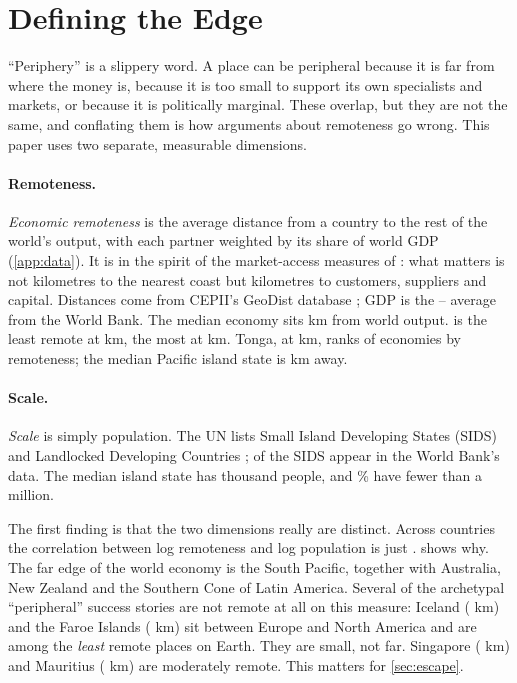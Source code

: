 \section{Defining the Edge}
\label{sec:edge}

\enquote{Periphery} is a slippery word. A place can be peripheral because it
is far from where the money is, because it is too small to support its own
specialists and markets, or because it is politically marginal. These
overlap, but they are not the same, and conflating them is how arguments
about remoteness go wrong. This paper uses two separate, measurable
dimensions.

\paragraph{Remoteness.} \emph{Economic remoteness} is the average distance
from a country to the rest of the world's output, with each partner weighted
by its share of world GDP (\cref{app:data}). It is in the spirit of the
market-access measures of \textcite{redding2004}: what matters is not
kilometres to the nearest coast but kilometres to customers, suppliers and
capital. Distances come from CEPII's GeoDist database \parencite{mayer2011};
GDP is the \windowStart--\windowEnd{} average from the World Bank. The median
economy sits \remoteMedianKm{} km from world output. \remoteMinName{} is the
least remote at \remoteMinKm{} km, \remoteMaxName{} the most at
\remoteMaxKm{} km. Tonga, at \remoteTongaKm{} km, ranks
\remoteTongaRank{} of \nCountriesRemote{} economies by remoteness; the
median Pacific island state is \remotePacificMedianKm{} km away.

\paragraph{Scale.} \emph{Scale} is simply population. The UN lists
\nSIDSunList{} Small Island Developing States (SIDS) and \nLLDC{} Landlocked
Developing Countries \parencite{unm49}; \nSIDS{} of the SIDS appear in the
World Bank's data. The median island state has \popSIDSMedianK{} thousand
people, and \shareSIDSUnderOneM\% have fewer than a million.



The first finding is that the two dimensions really are distinct. Across
countries the correlation between log remoteness and log population is just
\corrRemotePop.  shows why. The far edge of the world economy is
the South Pacific, together with Australia, New Zealand and the Southern Cone
of Latin America. Several of the archetypal \enquote{peripheral} success stories
are not remote at all on this measure: Iceland (\remoteIcelandKm{} km) and
the Faroe Islands (\remoteFaroesKm{} km) sit between Europe and North America
and are among the \emph{least} remote places on Earth. They are small, not
far. Singapore (\remoteSingaporeKm{} km) and Mauritius (\remoteMauritiusKm{}
km) are moderately remote. This matters for \cref{sec:escape}.

